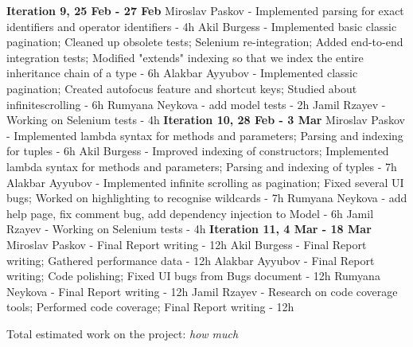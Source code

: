 \textbf{Iteration 9, 25 Feb - 27 Feb}
Miroslav Paskov - Implemented parsing for exact identifiers and operator identifiers - 4h
Akil Burgess - Implemented basic classic pagination; Cleaned up obsolete tests; Selenium re-integration; Added end-to-end integration tests; Modified "extends" indexing so that we index the entire inheritance chain of a type - 6h
Alakbar Ayyubov - Implemented classic pagination; Created autofocus feature and shortcut keys; Studied about infinitescrolling - 6h
Rumyana Neykova - add model tests - 2h
Jamil Rzayev - Working on Selenium tests - 4h
\textbf{Iteration 10, 28 Feb - 3 Mar}
Miroslav Paskov - Implemented lambda syntax for methods and parameters; Parsing and indexing for tuples - 6h
Akil Burgess - Improved indexing of constructors; Implemented lambda syntax for methods and parameters; Parsing and indexing of typles - 7h
Alakbar Ayyubov - Implemented infinite scrolling as pagination; Fixed several UI bugs; Worked on highlighting to recognise wildcards - 7h
Rumyana Neykova - add help page, fix comment bug, add dependency injection to Model - 6h  
Jamil Rzayev - Working on Selenium tests - 4h
\textbf{Iteration 11,  4 Mar - 18 Mar}
Miroslav Paskov - Final Report writing - 12h
Akil Burgess - Final Report writing; Gathered performance data - 12h     
Alakbar Ayyubov - Final Report writing; Code polishing; Fixed UI bugs from Bugs document - 12h
Rumyana Neykova - Final Report writing - 12h
Jamil Rzayev - Research on code coverage tools; Performed code coverage; Final Report writing - 12h

Total estimated work on the project: \emph{\color{red} how much}